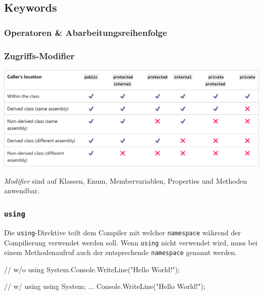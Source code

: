 \documentclass[
  9pt,
  a4paperpaper,
  DIV=11]{scrartcl}
\newenvironment{Shaded}{}{}
\newcommand{\CommentTok}[1]{\textcolor[rgb]{0.42,0.45,0.49}{#1}}
\newcommand{\FunctionTok}[1]{\textcolor[rgb]{0.44,0.26,0.76}{#1}}
\newcommand{\KeywordTok}[1]{\textcolor[rgb]{0.84,0.23,0.29}{#1}}
\newcommand{\NormalTok}[1]{\textcolor[rgb]{0.14,0.16,0.18}{#1}}
\newcommand{\OperatorTok}[1]{\textcolor[rgb]{0.14,0.16,0.18}{#1}}
\newcommand{\StringTok}[1]{\textcolor[rgb]{0.01,0.18,0.38}{#1}}
\numberwithin{equation}{section}
\begin{document}
\begin{multicols}{2}
\hypertarget{keywords}{%
\subsection{Keywords}\label{keywords}}

\hypertarget{operatoren-abarbeitungsreihenfolge}{%
\subsubsection{Operatoren \&
Abarbeitungsreihenfolge}\label{operatoren-abarbeitungsreihenfolge}}

\hypertarget{sec-modifier}{%
\subsubsection{Zugriffs-Modifier}\label{sec-modifier}}

\includegraphics{images/AccessModifiers.png}

\emph{Modifier} sind auf Klassen, Enum, Membervariablen, Properties und
Methoden anwendbar.

\hypertarget{using}{%
\subsubsection{\texorpdfstring{\texttt{using}}{using}}\label{using}}

Die \texttt{using}-Direktive teilt dem Compiler mit welcher
\texttt{namespace} während der Compilierung verwendet werden soll. Wenn
\texttt{using} nicht verwendet wird, muss bei einem Methodenaufruf auch
der entsprechende \texttt{namespace} genannt werden.

\begin{Shaded}
\begin{Highlighting}[]
\CommentTok{// w/o \textasciigrave{}using\textasciigrave{}}
\NormalTok{System}\OperatorTok{.}\FunctionTok{Console}\OperatorTok{.}\FunctionTok{WriteLine}\OperatorTok{(}\StringTok{"Hello World!"}\OperatorTok{);}

\CommentTok{// w/ \textasciigrave{}using\textasciigrave{}}
\KeywordTok{using}\NormalTok{ System}\OperatorTok{;}
\OperatorTok{...}
\NormalTok{Console}\OperatorTok{.}\FunctionTok{WriteLine}\OperatorTok{(}\StringTok{"Hello World!"}\OperatorTok{);}
\end{Highlighting}
\end{Shaded}


\end{multicols}
\end{document}
